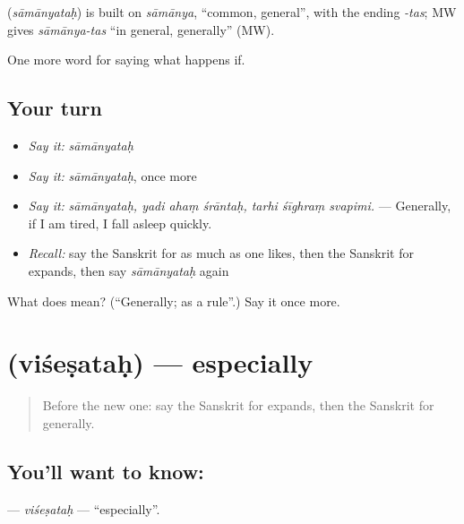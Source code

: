 \begin{cousinweb}
\textbf{} (\emph{sāmānyataḥ}) is built on \emph{sāmānya}, \textquotedblleft{}common, general\textquotedblright{}, with the ending \emph{-tas}; MW gives \emph{sāmānya-tas} \textquotedblleft{}in general, generally\textquotedblright{} (MW).
\end{cousinweb}

\begin{grammarlens}[title={What you've built}]
One more word for saying what happens if.
\end{grammarlens}

\subsection*{Your turn}
\begin{itemize}
\raggedright
  \item \emph{Say it:} \emph{sāmānyataḥ}
  \item \emph{Say it:} \emph{sāmānyataḥ}, once more
  \item \emph{Say it:} \emph{sāmānyataḥ, yadi ahaṃ śrāntaḥ, tarhi śīghraṃ svapimi.} — Generally, if I am tired, I fall asleep quickly.
  \item \emph{Recall:} say the Sanskrit for as much as one likes, then the Sanskrit for expands, then say \emph{sāmānyataḥ} again
\end{itemize}

\begin{tcolorbox}[breakable,colback=teal!4,colframe=teal!35!black,title={Before you move on}]
What does  mean? (\textquotedblleft{}Generally; as a rule\textquotedblright{}.) Say it once more.
\end{tcolorbox}
\section[\texorpdfstring{\sk{विशेषतः} (viśeṣataḥ)}{विशेषतः (viśeṣataḥ)}]{ (viśeṣataḥ) — especially}

\label{lesson:SA-C381-visesatah}



\begin{quote}
Before the new one: say the Sanskrit for expands, then the Sanskrit for generally.
\end{quote}

\subsection*{You'll want to know: }
\textbf{} — \emph{viśeṣataḥ} — \textquotedblleft{}especially\textquotedblright{}.

